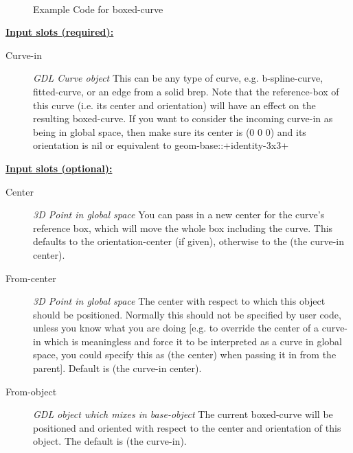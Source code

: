 \documentclass [11pt]{book}
\begin{document}
\begin{itemize}
\begin{figure}
\begin{lrbox}{\boxedverb}
\begin{minipage}{\linewidth}
{\begin{verbatim}
 
\end{verbatim}}
\end{minipage}
\end{lrbox}
\fbox{\usebox{\boxedverb}}

\caption{Example Code for boxed-curve}

\label{fig:example-code-boxed-curve}

\end{figure}





\textbf{
\underline{Input slots (required):}}

\begin{description}

\item [Curve-in]
\emph{GDL Curve object} This can be any type of curve, e.g. b-spline-curve, fitted-curve, or an edge from a solid brep.
Note that the reference-box of this curve (i.e. its center and orientation) will have an effect on the resulting
boxed-curve. If you want to consider the incoming curve-in as being in global space, then make sure its center
is (0 0 0) and its orientation is nil or equivalent to geom-base::+identity-3x3+


\end{description}






\textbf{
\underline{Input slots (optional):}}

\begin{description}

\item [Center]
\emph{3D Point in global space} You can pass in a new center for the curve's reference box,
which will move the whole box including the curve. This defaults to the
orientation-center (if given), otherwise to the (the curve-in center).


\item [From-center]
\emph{3D Point in global space} The center with respect to which this object should be positioned. Normally
this should not be specified by user code, unless you know what you are doing [e.g. to override the center
of a curve-in which is meaningless and force it to be interpreted as a curve in global space, you could
specify this as (the center) when passing it in from the parent].
Default is (the curve-in center).


\item [From-object]
\emph{GDL object which mixes in base-object} The current boxed-curve will be positioned and oriented with respect
to the center and orientation of this object. The default is (the curve-in).



\end{description}
\end{itemize}
\end{document}
